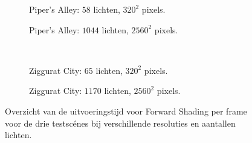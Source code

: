 \begin{figure}[t]
\begin{adjustbox}{minipage=\textwidth, scale=0.55}
\begin{subfigure}[b]{0.8\textwidth}
      \caption{Piper's Alley: $58$ lichten, $320^2$ pixels.}
      \label{fig:ts-frames-forward:alley-low}
    \end{subfigure}
  \end{adjustbox}\hspace{-0.075\textwidth} %
  \begin{adjustbox}{minipage=\textwidth, scale=0.55}
    \begin{subfigure}[b]{0.8\textwidth}
      \centering
      \def\svgwidth{\textwidth}
      
      \caption{Piper's Alley: $1044$ lichten, $2560^2$ pixels.}
      \label{fig:ts-frames-forward:alley-high}
    \end{subfigure}
  \end{adjustbox} \\
  \begin{adjustbox}{minipage=\textwidth, scale=0.55}
    \begin{subfigure}[b]{0.8\textwidth}
      \centering
      \def\svgwidth{\textwidth}
      
      \caption{Ziggurat City: $65$ lichten, $320^2$ pixels.}
      \label{fig:ts-frames-forward:city-low}
    \end{subfigure}
  \end{adjustbox}\hspace{-0.075\textwidth} %
  \begin{adjustbox}{minipage=\textwidth, scale=0.55}
    \begin{subfigure}[b]{0.8\textwidth}
      \centering
      \def\svgwidth{\textwidth}
      
      \caption{Ziggurat City: $1170$ lichten, $2560^2$ pixels.}
      \label{fig:ts-frames-forward:city-high}
    \end{subfigure}
  \end{adjustbox}
  \caption{Overzicht van de uitvoeringstijd voor Forward Shading per frame voor de
           drie testsc\'enes bij verschillende resoluties en aantallen lichten.}
  \label{fig:ts-frames-forward}
\end{figure}

